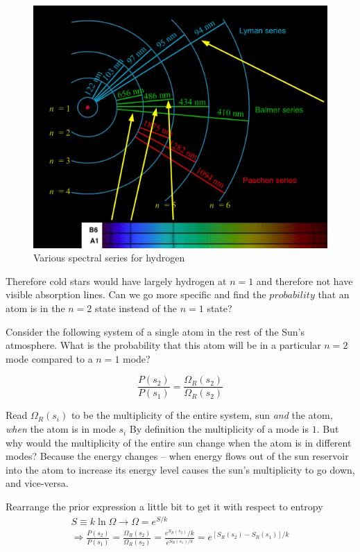 \documentclass[10pt]{article}
\begin{document}
\begin{figure}[H]
	\centering
	\includegraphics[width=0.8\linewidth]{img/294_hydrogen_series.png}
	\caption{Various spectral series for hydrogen}
	\label{fig:294:hydrogen_series}
\end{figure}

Therefore cold stars would have largely hydrogen at $ n=1 $  and therefore not have visible absorption lines. 
Can we go more specific and find the $ probability $ that an atom is in the $ n= 2$ state instead of the $ n=1 $ state? 


Consider the following system of a single atom in the rest of the Sun's atmosphere. 
What is the probability that this atom will be in a particular $ n=2 $ mode compared to a $ n=1 $  mode?

\begin{equation}
	\frac{P(s_2)}{P(s_1)} = \frac{\Omega_R(s_2)}{\Omega_R(s_2)}
\end{equation}

Read $ \Omega_R(s_i) $ to be the multiplicity of the entire system, sun \textit{and} the atom, \textit{when} the atom is in mode $ s_i $  
By definition the multiplicity of a mode is $ 1 $. 
But why would the multiplicity of the entire sun change when the atom is in different modes?
Because the energy changes -- when energy flows out of the sun reservoir into the atom to increase its energy level causes the sun's multiplicity to go down, and vice-versa.


Rearrange the prior expression a little bit to get it with respect to entropy
\begin{multline}
	S \equiv k \ln \Omega \rightarrow \Omega = e^{S /k} \\
	\Rightarrow \frac{P(s_2)}{P(s_1)} = \frac{\Omega_R(s_2)}{\Omega_R(s_2)} = \frac{e^{S_R(s_2)} /k}{e^{S_R(s_1) /k}}  = e^{[S_R(s_2) - S_R(s_1)]/k} \\
	\label{eq:294:energy_level_sun_deriv_prob_ratio}
\end{multline}
\end{document}
